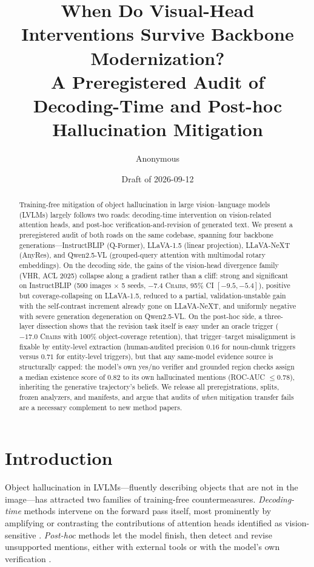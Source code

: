 \documentclass[11pt]{article}
\title{When Do Visual-Head Interventions Survive Backbone Modernization?\\
A Preregistered Audit of Decoding-Time and Post-hoc Hallucination Mitigation}
\author{Anonymous}
\date{Draft of 2026-09-12}
\newcommand{\chair}{\textsc{Chair}}
\newcommand{\vhr}{VHR}
\begin{document}
\maketitle

\begin{abstract}
Training-free mitigation of object hallucination in large vision--language models (LVLMs) largely follows two roads: decoding-time intervention on vision-related attention heads, and post-hoc verification-and-revision of generated text. We present a preregistered audit of both roads on the same codebase, spanning four backbone generations---InstructBLIP (Q-Former), LLaVA-1.5 (linear projection), LLaVA-NeXT (AnyRes), and Qwen2.5-VL (grouped-query attention with multimodal rotary embeddings). On the decoding side, the gains of the vision-head divergence family (\vhr{}, ACL 2025) collapse along a gradient rather than a cliff: strong and significant on InstructBLIP (500 images $\times$ 5 seeds, $-7.4$ \chair{s}, 95\% CI $[-9.5,-5.4]$), positive but coverage-collapsing on LLaVA-1.5, reduced to a partial, validation-unstable gain with the self-contrast increment already gone on LLaVA-NeXT, and uniformly negative with severe generation degeneration on Qwen2.5-VL. On the post-hoc side, a three-layer dissection shows that the revision task itself is easy under an oracle trigger ($-17.0$ \chair{s} with 100\% object-coverage retention), that trigger--target misalignment is fixable by entity-level extraction (human-audited precision $0.16$ for noun-chunk triggers versus $0.71$ for entity-level triggers), but that any same-model evidence source is structurally capped: the model's own yes/no verifier and grounded region checks assign a median existence score of $0.82$ to its own hallucinated mentions (ROC-AUC $\le 0.78$), inheriting the generative trajectory's beliefs. We release all preregistrations, splits, frozen analyzers, and manifests, and argue that audits of \emph{when} mitigation transfer fails are a necessary complement to new method papers.
\end{abstract}

\section{Introduction}
\label{sec:intro}

Object hallucination in LVLMs---fluently describing objects that are not in the image---has attracted two families of training-free countermeasures. \emph{Decoding-time} methods intervene on the forward pass itself, most prominently by amplifying or contrasting the contributions of attention heads identified as vision-sensitive \citep{vhr2025,leng2024vcd,huang2024opera,chuang2024dola}. \emph{Post-hoc} methods let the model finish, then detect and revise unsupported mentions, either with external tools \citep{yin2024woodpecker} or with the model's own verification \citep{chen2024halc}.
\end{document}
